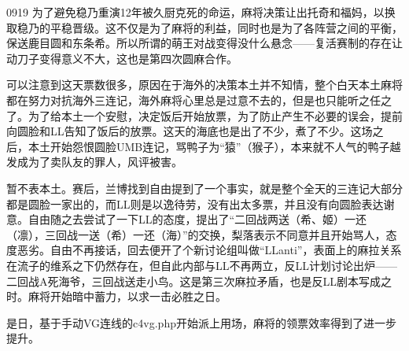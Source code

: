 
0919 为了避免稳乃重演12年被久厨克死的命运，麻将决策让出托奇和福妈，以换取稳乃的平稳晋级。这不仅是为了麻将的利益，同时也是为了各阵营之间的平衡，保送鹿目圆和东条希。所以所谓的萌王对战变得没什么悬念——复活赛制的存在让动刀子变得意义不大，这也是第四次圆麻合作。

可以注意到这天票数很多，原因在于海外的决策本土并不知情，整个白天本土麻将都在努力对抗海外三连记，海外麻将心里总是过意不去的，但是也只能听之任之了。为了给本土一个安慰，决定饭后开始放票，为了防止产生不必要的误会，提前向圆脸和LL告知了饭后的放票。这天的海底也是出了不少，煮了不少。这场之后，本土开始怨恨圆脸UMB连记，骂鸭子为“猿”（猴子），本来就不人气的鸭子越发成为了卖队友的罪人，风评被害。

暂不表本土。赛后，兰博找到自由提到了一个事实，就是整个全天的三连记大部分都是圆脸一家出的，而LL则是以逸待劳，没有出太多票，并且没有向圆脸表达谢意。自由随之去尝试了一下LL的态度，提出了“二回战两送（希、姬）一还（凛），三回战一送（希）一还（海）”的交换，梨落表示不同意并且开始骂人，态度恶劣。自由不再接话，回去便开了个新讨论组叫做“LLanti”，表面上的麻拉关系在流子的维系之下仍然存在，但自此内部与LL不再两立，反LL计划讨论出炉——二回战A死海爷，三回战送走小鸟。这是第三次麻拉矛盾，也是反LL剧本写成之时。麻将开始暗中蓄力，以求一击必胜之日。

是日，基于手动VG连线的c4vg.php开始派上用场，麻将的领票效率得到了进一步提升。

